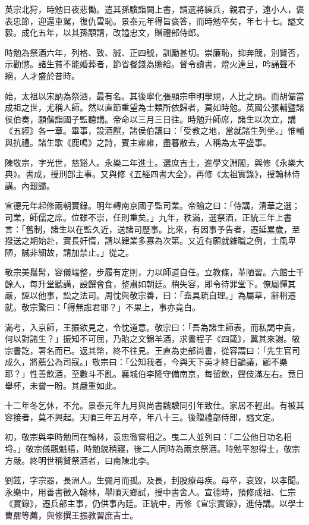 \begin{pinyinscope}
英宗北狩，時勉日夜悲慟。遣其孫驥詣闕上書，請選將練兵，親君子，遠小人，褒表忠節，迎還車駕，復仇雪恥。景泰元年得旨褒答，而時勉卒矣，年七十七。謚文毅。成化五年，以其孫顒請，改謚忠文，贈禮部侍郎。

時勉為祭酒六年，列格、致、誠、正四號，訓勵甚切。崇廉恥，抑奔競，別賢否，示勸懲。諸生貧不能婚葬者，節省餐錢為贍給。督令讀書，燈火達旦，吟誦聲不絕，人才盛於昔時。

始，太祖以宋訥為祭酒，最有名。其後寧化張顯宗申明學規，人比之訥。而胡儼當成祖之世，尤稱人師。然以直節重望為士類所依歸者，莫如時勉。英國公張輔暨諸侯伯奏，願偕詣國子監聽講。帝命以三月三日往。時勉升師席，諸生以次立，講《五經》各一章。畢事，設酒饌，諸侯伯讓曰：「受教之地，當就諸生列坐。」惟輔與抗禮。諸生歌《鹿鳴》之詩，賓主雍雍，盡暮散去，人稱為太平盛事。

陳敬宗，字光世，慈谿人。永樂二年進士。選庶吉士，進學文淵閣，與修《永樂大典》。書成，授刑部主事。又與修《五經四書大全》，再修《太祖實錄》，授翰林侍講。內艱歸。

宣德元年起修兩朝實錄。明年轉南京國子監司業。帝諭之曰：「侍講，清華之選；司業，師儒之席。位雖不崇，任則重矣。」九年，秩滿，選祭酒，正統三年上書言：「舊制，諸生以在監久近，送諸司歷事。比來，有因事予告者，遷延累歲，至撥送之期始赴，實長奸惰，請以肄業多寡為次第。又近有願就雜職之例，士風卑陋，誠非細故，請加禁止。」從之。

敬宗美鬚髯，容儀端整，步履有定則，力以師道自任。立教條，革陋習。六館士千餘人，每升堂聽講，設饌會食，整肅如朝廷。稍失容，即令待罪堂下。僚屬憚其嚴，誣以他事，訟之法司。周忱與敬宗善，曰：「盍具疏自理。」為屬草，辭稍遷就。敬宗驚曰：「得無誑君耶？」不果上，事亦竟白。

滿考，入京師，王振欲見之，令忱道意。敬宗曰：「吾為諸生師表，而私謁中貴，何以對諸生？」振知不可屈，乃貽之文錦羊酒，求書程子《四箴》，冀其來謝。敬宗書訖，署名而已。返其幣，終不往見。王直為吏部尚書，從容謂曰：「先生官司成久，將薦公為司寇。」敬宗曰：「公知我者，今與天下英才終日論議，顧不樂耶？」性善飲酒，至數斗不亂。襄城伯李隆守備南京，每留飲，聲伎滿左右。竟日舉杯，未嘗一盼。其嚴重如此。

十二年冬乞休，不允。景泰元年九月與尚書魏驥同引年致仕。家居不輕出。有被其容接者，莫不興起。天順三年五月卒，年八十三。後贈禮部侍郎，謚文定。

初，敬宗與李時勉同在翰林，袁忠徹嘗相之。曳二人並列曰：「二公他日功名相埒。」敬宗儀觀魁梧，時勉貌稍寢，後二人同時為兩京祭酒。時勉平恕得士，敬宗方嚴。終明世稱賢祭酒者，曰南陳北李。

劉鉉，字宗器，長洲人。生彌月而孤。及長，刲股療母疾。母卒，哀毀，以孝聞。永樂中，用善書徵入翰林，舉順天鄉試，授中書舍人。宣德時，預修成祖、仁宗《實錄》，遷兵部主事，仍供事內廷。正統中，再修《宣宗實錄》，進侍講。以學士曹鼐等薦，與修撰王振教習庶吉士。


\end{pinyinscope}
